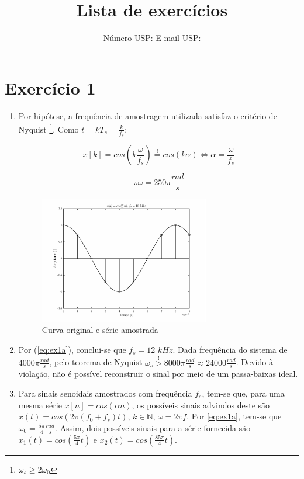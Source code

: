 \documentclass{article}
\title{Lista de exercícios \esnumber}
\author{\studentname \qquad Número USP: \uspid \qquad E-mail USP: \uspmail}
\begin{document}
\maketitle

\section*{Exercício 1}
\begin{enumerate}
\item %

Por hipótese, a frequência de amostragem utilizada satisfaz o critério de Nyquist \footnote{$\omega_s \geq 2\omega_0$}. Como $t = kT_s = \frac{k}{f_s}$:

\begin{equation}
\label{eq:ex1a}
x[k] = cos(k \frac{\omega}{f_s})  \stackrel{!}{=} cos(k \alpha) \Longleftrightarrow \alpha = \frac{\omega}{f_s}
\end{equation}

\begin{equation}
\therefore \omega = 250\pi \frac{rad}{s}
\end{equation}

\begin{figure}[!h]
	\center
	\includegraphics[width=0.7\textwidth]{./images/ex1a.eps}
	\caption{Curva original e série amostrada}
	\label{fig:boat1}
\end{figure}

\item %
Por (\ref{eq:ex1a}), conclui-se que $f_s = 12$ $kHz$. Dada frequência do sistema de $4000\pi \frac{rad}{s}$, pelo teorema de Nyquist $\omega_s \stackrel{!}{>} 8000\pi \frac{rad}{s} \approx 24000 \frac{rad}{s}$. Devido à violação, não é possível reconstruir o sinal por meio de um passa-baixas ideal. 

\item %
Para sinais senoidais amostrados com frequência $f_s$, tem-se que, para uma mesma série $x[n] = cos(\alpha n)$, os possíveis sinais advindos deste são $x(t) = cos(2 \pi (f_0 + f_s)t) \mbox{, } k \in \mathbb{N} \mbox{, } \omega = 2 \pi f$. Por \ref{eq:ex1a}, tem-se que $\omega_0 = \frac{5\pi}{4} \frac{rad}{s}$. Assim, dois possíveis sinais para a série fornecida são $x_1(t) = cos(\frac{5\pi}{4} t )$ e $x_2(t) = cos(\frac{85\pi}{4} t)$.

\end{enumerate}
\end{document}
